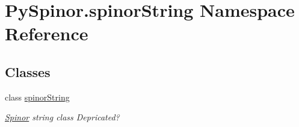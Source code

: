 \hypertarget{namespace_py_spinor_1_1spinor_string}{}\section{Py\+Spinor.\+spinor\+String Namespace Reference}
\label{namespace_py_spinor_1_1spinor_string}
\subsection*{Classes}
\begin{DoxyCompactItemize}
\item 
class \hyperlink{class_py_spinor_1_1spinor_string_1_1spinor_string}{spinor\+String}
\begin{DoxyCompactList}\small\item\em \hyperlink{namespace_py_spinor_1_1_spinor}{Spinor} string class Depricated? \end{DoxyCompactList}\end{DoxyCompactItemize}
